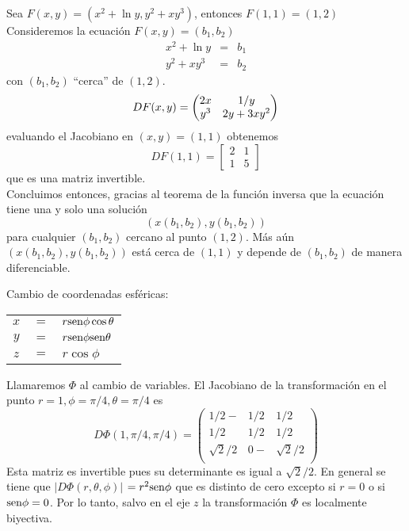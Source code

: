\begin{ejemplo}
Sea $F(x,y)=(x^2+\ln{y},y^2+xy^3)$, entonces $F(1,1)=(1,2)$ \\
Consideremos la ecuaci\'on $F(x,y)=(b_1,b_2)$
\begin{eqnarray*}
  x^2+\ln{y} & = & b_1 \\
  y^2+xy^3 & = & b_2
\end{eqnarray*}
 con $(b_1,b_2)$ ``cerca'' de $(1,2)$. $$ DF(x,y)=\begin{pmatrix}
  2x & 1/y \cr
  y^3 & 2y+3xy^2 \cr
\end{pmatrix} $$
 evaluando el Jacobiano en  $(x,y)=(1,1)$ obtenemos
 \begin{equation*}
 DF(1,1)=
 \begin{bmatrix}
 2&1 \\ 
 1&5 
 \end{bmatrix}
 \end{equation*}
 que es una matriz invertible.
 \\Concluimos entonces, gracias al teorema de la funci\'on inversa
 que la ecuaci\'on tiene una y solo una soluci\'on
 $$(x(b_1,b_2),y(b_1,b_2))$$ para cualquier $(b_1,b_2)$ cercano al
 punto $(1,2)$. M\'as a\'un $(x(b_1,b_2),y(b_1,b_2))$ est\'a
 cerca de $(1,1)$ y depende de $(b_1,b_2)$ de manera
 diferenciable.
\end{ejemplo}

\begin{ejemplo}
Cambio de coordenadas esf\'ericas:
\begin{center}
\begin{tabular}{ccl}
        $x$ &$=$& $r\text{sen}\phi\cos\theta$ \\
        $y$ &$=$& $r\text{sen}\phi\text{sen}\theta$ \\
        $z$ &$=$& $r\cos\phi$ \\
\end{tabular}
\end{center}
 Llamaremos $\Phi$ al cambio de variables. El Jacobiano de la
transformaci\'on en el punto $r=1,\phi=\pi/4,\theta=\pi/4$ es
$$D\Phi(1,\pi/4,\pi/4)=
\left(
\begin{array}{ccc}
1/2        -&1/2   &1/2        \\
1/2         &1/2   &1/2        \\
\sqrt{2}/2  &0    -&\sqrt{2}/2 \\
\end{array} \right)$$ 
Esta matriz es invertible pues su
determinante es igual a $\sqrt{2}/2$. En general se tiene que
$|D\Phi(r,\theta,\phi)|$
$=r^2\text{sen}\phi$ que es distinto de cero
excepto si $r=0$ o si $\text{sen}\phi=0$. Por lo tanto, salvo en el eje
$z$ la transformaci\'on $\Phi$ es localmente biyectiva.
\end{ejemplo}

